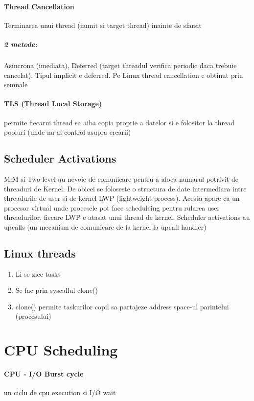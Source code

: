 \documentclass{article}
\begin{document}
\paragraph*{Thread Cancellation} Terminarea unui thread (numit si target thread) inainte de sfarsit
\subparagraph*{2 metode:} Asincrona (imediata), Deferred (target threadul verifica periodic daca trebuie cancelat). Tipul implicit e deferred. Pe Linux thread cancellation e obtinut prin semnale

\paragraph*{TLS (Thread Local Storage)} permite fiecarui thread sa aiba copia proprie a datelor si e folositor la thread pooluri (unde nu ai control asupra crearii)

\subsection*{Scheduler Activations}
M:M si Two-level au nevoie de comunicare pentru a aloca numarul potrivit de threaduri de Kernel. De obicei se foloseste o structura de date intermediara intre threadurile de user si de kernel LWP (lightweight process). Acesta apare ca un procesor virtual unde procesele pot face scheduleing pentru rularea user threadurilor, fiecare LWP e atasat unui thread de kernel. Scheduler activations au upcalls (un mecanism de comunicare de la kernel la upcall handler)

\subsection*{Linux threads}
\begin{enumerate}
    \item Li se zice tasks
    \item Se fac prin syscallul clone()
    \item clone() permite taskurilor copil sa partajeze address space-ul parintelui (procesului)
\end{enumerate}

\section[Ch5 CPU Scheduling]{CPU Scheduling}
\paragraph*{CPU - I/O Burst cycle} un ciclu de cpu execution si I/O wait
\end{document}
